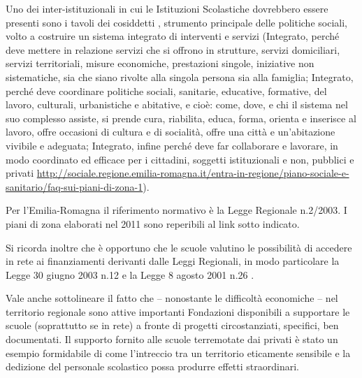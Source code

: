 \begin{description}
\begin{enumerate}
			Uno dei  inter-istituzionali in cui le Istituzioni Scolastiche dovrebbero essere presenti sono i tavoli dei cosiddetti , strumento principale delle politiche sociali, volto a costruire un sistema integrato di interventi e servizi (Integrato, perché deve mettere in relazione servizi che si offrono in strutture, servizi domiciliari, servizi territoriali, misure economiche, prestazioni singole, iniziative non sistematiche, sia che siano rivolte alla singola persona
			sia alla famiglia; Integrato, perché deve coordinare politiche sociali, sanitarie, educative, formative,
			del lavoro, culturali, urbanistiche e abitative, e cioè: come, dove, e chi il sistema nel suo complesso
			assiste, si prende cura, riabilita, educa, forma, orienta e inserisce al lavoro, offre occasioni di cultura e
			di socialità, offre una città e un'abitazione vivibile e adeguata; Integrato, infine perché deve far
			collaborare e lavorare, in modo coordinato ed efficace per i cittadini, soggetti istituzionali e non,
			pubblici e privati
			\url{http://sociale.regione.emilia-romagna.it/entra-in-regione/piano-sociale-e-sanitario/faq-sui-piani-di-zona-1}).
			
			Per l'Emilia-Romagna il riferimento normativo è la Legge Regionale n.2/2003. I piani di zona elaborati
			nel 2011 sono reperibili al link sotto indicato.
			
			Si ricorda inoltre che è opportuno che le scuole valutino le possibilità di accedere in rete ai
			finanziamenti derivanti dalle Leggi Regionali, in modo particolare la Legge 30 giugno 2003 n.12  e la Legge 8 agosto 2001 n.26 .
			
			Vale anche sottolineare il fatto che – nonostante le difficoltà economiche – nel territorio regionale
			sono attive importanti Fondazioni disponibili a supportare le scuole (soprattutto se in rete) a fronte di
			progetti circostanziati, specifici, ben documentati. Il supporto fornito alle scuole terremotate dai
			privati è stato un esempio formidabile di come l'intreccio tra un territorio eticamente sensibile e la
			dedizione del personale scolastico possa produrre effetti straordinari.
			

\end{enumerate}
\end{description}
